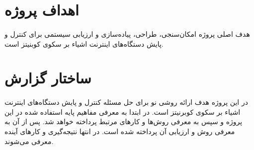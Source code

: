 \section{اهداف پروژه}
\paragraph{}
{
    هدف اصلی پروژه امکان‌سنجی، طراحی، پیاده‌سازی و ارزیابی سیستمی برای کنترل و پایش دستگاه‌های اینترنت اشیاء بر سکوی کوبنیتز است.
}
\section{ساختار گزارش}
\paragraph{}
{
    در این پروژه هدف ارائه 
    روشی نو برای حل مسئله کنترل و پایش دستگاه‌های اینترنت اشیاء بر سکوی کوبرنیتز است. 
    در ابتدا به معرفی مفاهیم پایه استفاده شده در این پروژه 
    و سپس به معرفی روش‌ها و کارهای مرتبط پرداخته‌ 
    خواهد شد. پس از آن به معرفی 
    روش و ارزیابی آن پرداخته شده است. در انتها نتیجه‌گیری و 
    کارهای آینده معرفی می‌شوند. 
}